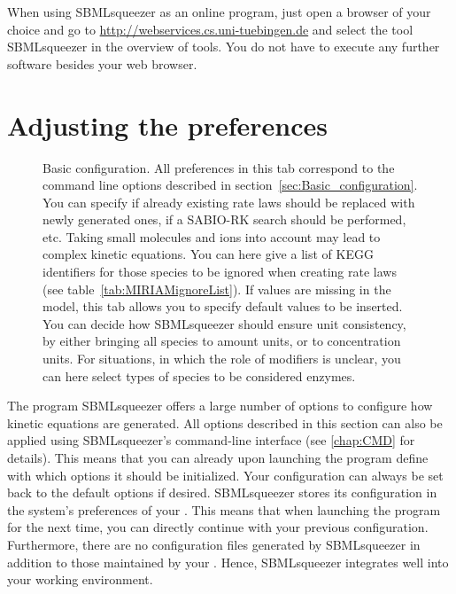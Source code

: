 When using SBMLsqueezer as an online program, just open a browser of your choice and go to \url{http://webservices.cs.uni-tuebingen.de} and select the tool SBMLsqueezer in the overview of tools.
You do not have to execute any further software besides your web browser.

\section{Adjusting the preferences}
\label{sec:GUIPrefs}

\begin{figure}
\caption[Basic configuration]{Basic configuration. All preferences %
in this tab correspond to the command line options described in section~\ref{sec:Basic_configuration}.
You can specify if already existing rate laws should be replaced with newly generated ones, if a SABIO-RK search
should be performed, etc. %
Taking small molecules and ions into account may lead to complex kinetic equations.
You can here give a list of KEGG %
identifiers for those species to be ignored when creating rate laws (see table~\ref{tab:MIRIAMignoreList}).
If values are missing in the model, this tab allows you to specify default values to be inserted. %
You can decide how SBMLsqueezer should ensure unit consistency,
by either bringing all species to amount units, or to concentration units.
For situations, in which the role of modifiers is unclear, you
can here select types of species to be considered enzymes.%
}\label{fig:BasicConf}
\end{figure}
The program SBMLsqueezer offers a large number of options to configure how
kinetic equations are generated.
All options described in this section can also be applied using SBMLsqueezer's
command-line interface (see \vref{chap:CMD} for details).
This means that you can already upon launching the program define with which
options it should be initialized.
Your configuration can always be set back to the default options if desired.
SBMLsqueezer stores its configuration in the system's preferences of your \OS.
This means that when launching the program for the next time, you can directly
continue with your previous configuration.
Furthermore, there are no configuration files generated by SBMLsqueezer in
addition to those maintained by your \OS.
Hence, SBMLsqueezer integrates well into your working environment.

